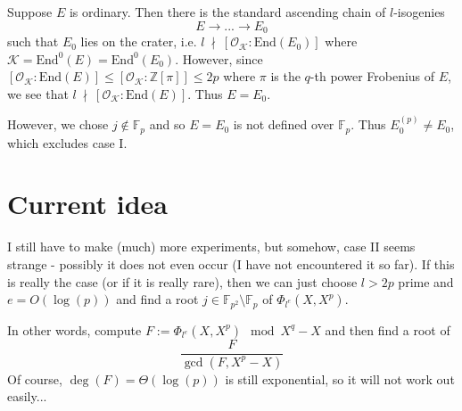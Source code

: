 \documentclass{scrartcl}
\newcommand{\Z}{\mathbb{Z}}
\newcommand{\F}{\mathbb{F}}
\newcommand{\End}{\mathrm{End}}
\newcommand{\notdivides}{\ \nmid \ }
\newcommand{\K}{\mathcal{K}}
\renewcommand{\O}{\mathcal{O}}
\theoremstyle{definition}
\begin{document}
Suppose $E$ is ordinary.
Then there is the standard ascending chain of $l$-isogenies
\begin{equation*}
    E \to ... \to E_0
\end{equation*}
such that $E_0$ lies on the crater, i.e. $l \notdivides [\O_\K : \End(E_0)]$ where $\K = \End^0(E) = \End^0(E_0)$.
However, since $[\O_\K : \End(E)] \leq [\O_\K : \Z[\pi]] \leq 2p$ where $\pi$ is the $q$-th power Frobenius of $E$, we see that $l \notdivides [\O_\K : \End(E)]$.
Thus $E = E_0$.

However, we chose $j \notin \F_p$ and so $E = E_0$ is not defined over $\F_p$.
Thus $E_0^{(p)} \neq E_0$, which excludes case I.

\section*{Current idea}
I still have to make (much) more experiments, but somehow, case II seems strange - possibly it does not even occur (I have not encountered it so far).
If this is really the case (or if it is really rare), then we can just choose $l > 2p$ prime and $e = O(\log(p))$ and find a root $j \in \F_{p^2} \setminus \F_p$ of $\Phi_{l^e}(X, X^p)$.

In other words, compute $F := \Phi_{l^e}(X, X^p) \mod X^q - X$ and then find a root of
\begin{equation*}
    \frac {F} {\gcd(F, X^p - X)}
\end{equation*}
Of course, $\deg(F) = \Theta(\log(p))$ is still exponential, so it will not work out easily...
\end{document}
